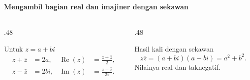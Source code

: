 \documentclass{../../kalkulus-ppt}
\DeclareMathOperator{\Real}{Re}
\DeclareMathOperator{\Imag}{Im}
\begin{document}
\begin{frame}
    \frametitle{\insertsection}
    \framesubtitle{Mengambil bagian real dan imajiner dengan sekawan}
    \begin{columns}[c,onlytextwidth]
        \begin{column}{.48\textwidth}
            \begin{block}{Untuk $z=a+bi$}
                \[
                    \begin{aligned}
                        z+\bar z&=2a, &
                        \Real(z)&=\frac{z+\bar z}{2},\\
                        z-\bar z&=2bi, &
                        \Imag(z)&=\frac{z-\bar z}{2i}.
                    \end{aligned}
                \]
            \end{block}
        \end{column}
        \begin{column}{.48\textwidth}
            \begin{block}{Hasil kali dengan sekawan}
                \[
                    z\bar z=(a+bi)(a-bi)=a^2+b^2.
                \]
                Nilainya real dan taknegatif.
            \end{block}
        \end{column}
    \end{columns}
\end{frame}
\end{document}
